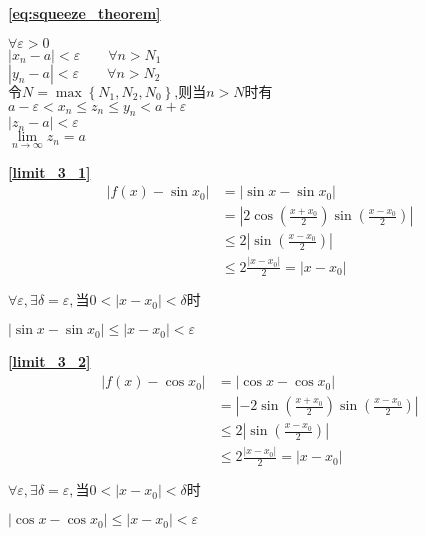 \textbf{\large \ref{eq:squeeze_theorem}}
\begin{center}
    $\forall \varepsilon > 0$\\
$\left|x_n-a\right|<\varepsilon\qquad\forall n>N_1$\\
$\left|y_n-a\right|<\varepsilon\qquad\forall n>N_2$\\
$\mbox{令}N = \max\left\{{N_1,N_2,N_0}\right\}\mbox{,则当}n > N\mbox{时有}$\\
$a-\varepsilon<x_n\le z_n\le y_n < a+\varepsilon$\\
$\left|z_n-a\right|<\varepsilon$\\
$\lim\limits_{{n}\to{\infty}}z_n = a$
\end{center}

\textbf{\large \ref{limit_3_1}}
\begin{displaymath}
    \begin{split}
        \left|f(x)-\sin x_0\right|&=\left|\sin x-\sin x_0\right|\\
                                &=\left|2\cos(\frac{x+x_0}{2})\sin(\frac{x-x_0}{2})\right|\\
                                &\leqslant 2\left|\sin(\frac{x-x_0}{2})\right|\\
                                &\leqslant 2\frac{\left|x-x_0\right|}{2}= \left|x-x_0\right|
    \end{split}
\end{displaymath}
\centerline{ $\forall \varepsilon,\exists \delta =\varepsilon,\mbox{当}0<\left|x-x_0\right|<\delta\mbox{时}$}
\centerline{$\left|\sin x-\sin x_0\right| \leqslant\left|x-x_0\right|<\varepsilon$}

\textbf{\large \ref{limit_3_2}}
\begin{displaymath}
    \begin{split}
        \left|f(x)-\cos x_0\right|&=\left|\cos x-\cos x_0\right|\\
                                &=\left|-2\sin(\frac{x+x_0}{2})\sin(\frac{x-x_0}{2})\right|\\
                                &\leqslant 2\left|\sin(\frac{x-x_0}{2})\right|\\
                                &\leqslant 2\frac{\left|x-x_0\right|}{2}= \left|x-x_0\right|
    \end{split}
\end{displaymath}
\centerline{ $\forall \varepsilon,\exists \delta =\varepsilon,\mbox{当}0<\left|x-x_0\right|<\delta\mbox{时}$}
\centerline{$\left|\cos x-\cos x_0\right| \leqslant\left|x-x_0\right|<\varepsilon$}

